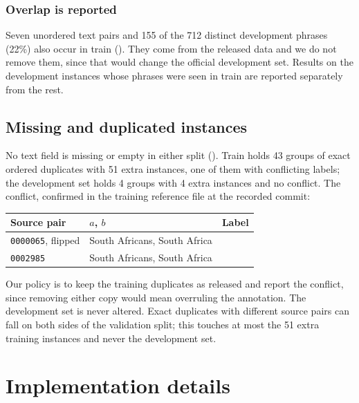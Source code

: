 \subsubsection*{Overlap is reported}
Seven unordered text pairs and 155 of the 712 distinct development phrases (22\%) also occur in train (). They come from the released data and we do not remove them, since that would change the official development set. Results on the development instances whose phrases were seen in train are reported separately from the rest.

\subsection{Missing and duplicated instances}
\label{sec:protocol-quality}

No text field is missing or empty in either split (). Train holds 43 groups of exact ordered duplicates with 51 extra instances, one of them with conflicting labels; the development set holds 4 groups with 4 extra instances and no conflict. The conflict, confirmed in the training reference file at the recorded commit:

\begin{center}
\footnotesize
\begin{tabular}{@{}L{0.27\columnwidth}L{0.42\columnwidth}l@{}}
\toprule
Source pair & $a$, $b$ & Label \\
\midrule
\texttt{0000065}, flipped & South Africans, South Africa & \FW{} \\
\texttt{0002985} & South Africans, South Africa & \NO{} \\
\bottomrule
\end{tabular}
\end{center}

Our policy is to keep the training duplicates as released and report the conflict, since removing either copy would mean overruling the annotation. The development set is never altered. Exact duplicates with different source pairs can fall on both sides of the validation split; this touches at most the 51 extra training instances and never the development set.


\section{Implementation details}
\label{app:implementation}

